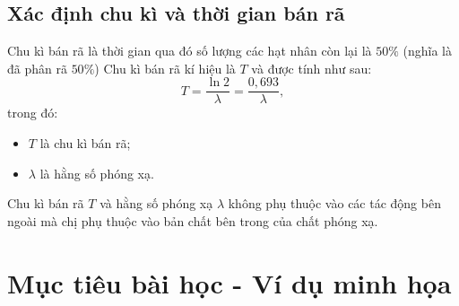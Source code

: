 \subsection{Xác định chu kì và thời gian bán rã}

	Chu kì bán rã là thời gian qua đó số lượng các hạt nhân còn lại là $50\%$ (nghĩa là đã phân rã $50\%$) Chu kì bán rã kí hiệu là $T$ và được tính như sau:
	\begin{equation}
	T=\dfrac{\ln 2}{\lambda}=\dfrac{0,693}{\lambda},
	\end{equation}
	trong đó:
	\begin{itemize}
		\item $T$ là chu kì bán rã;
		\item $\lambda$ là hằng số phóng xạ.
	\end{itemize}

	Chu kì bán rã $T$ và hằng số phóng xạ $\lambda$ không phụ thuộc vào các tác động bên ngoài mà chị phụ thuộc vào bản chất bên trong của chất phóng xạ.


\section{Mục tiêu bài học - Ví dụ minh họa}


